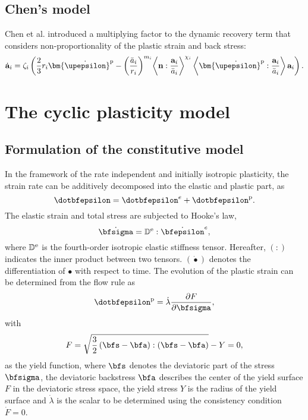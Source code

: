 \subsection{Chen's model}
\noindent
Chen et al. \cite{chen2004modified} introduced a multiplying factor to the dynamic recovery term that considers non-proportionality of the plastic strain and back stress:
\begin{equation}
{{\dot{\bf a}}_i} = {\zeta _i}\left( {\frac{2}{3}{r_i}{{{\bm{\dot \upepsilon }}}^{\rm{p}}} - {{\left( {\frac{{{{\bar a}_i}}}{{{r_i}}}} \right)}^{{m_i}}}{{\left\langle {{\bf{n}}:\frac{{{{\bf{a}}_i}}}{{{{\bar a}_i}}}} \right\rangle }^{{\chi _i}}}\left\langle {{{{\bm{\dot \upepsilon }}}^{\rm{p}}}:\frac{{{{\bf{a}}_i}}}{{{{\bar a}_i}}}} \right\rangle {{\bf{a}}_i}} \right).
\end{equation}

\section{The cyclic plasticity model}

\subsection{Formulation of the constitutive model}
\noindent
In the framework of the rate independent and initially isotropic plasticity, the strain rate can be additively decomposed into the elastic and plastic  part, as
\begin{equation}
\dotbfepsilon = {\dotbfepsilon}^e + {\dotbfepsilon}^{\rm{p}}.
\end{equation}
The elastic strain and total stress are subjected to Hooke's law,
\begin{equation}
{\dot\bfsigma} = {\mathbb{D}^{\rm{e}}}:{\dot\bfepsilon^e},
\label{Equ:HookesLaw}
\end{equation}
where ${\mathbb{D}^{\rm{e}}}$ is the fourth-order isotropic elastic stiffness tensor. Hereafter, $(:)$ indicates the inner product between two tensors. $({\dot  \bullet })$ denotes the differentiation of $\bullet$ with respect to time.
The evolution of the plastic strain can be determined from the flow rule as
\begin{equation}
{\dotbfepsilon}^{\rm{p}} = \dot \lambda \frac{{\partial F}}{{\partial {\bfsigma}}},
\end{equation}
with
\begin{equation}
F = \sqrt {\frac{3}{2}\left( {\bfs - \bfa} \right):\left( {\bfs - \bfa} \right)}  - Y=0,
\end{equation}
as the yield function, where $\bfs$ denotes the deviatoric part of the stress ${\bfsigma}$, the deviatoric backstress $\bfa$ describes the center of the yield surface $F$ in the deviatoric stress space, the yield stress $Y$ is the radius of the yield surface and $\dot \lambda$ is the scalar to be determined using the consistency condition $\dot F = 0$.


